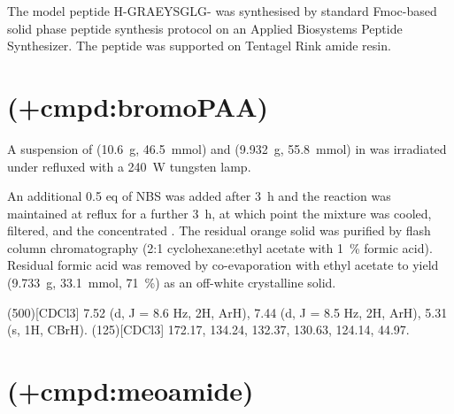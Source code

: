 The model peptide H-GRAEYSGLG-  was synthesised by standard Fmoc-based solid phase peptide synthesis protocol on an Applied Biosystems Peptide Synthesizer. The peptide was supported on Tentagel Rink amide resin.


\section{ (\cmpd+{cmpd:bromoPAA})}

\begin{experimental}[delta=(ppm),pos-number=sub,use-equal]

A suspension of  (\SI{10.6}{\gram}, \SI{46.5}{\milli\mol}) and  (\SI{9.932}{\gram}, \SI{55.8}{\milli\mol}) in  was irradiated under refluxed with a \SI{240}{\watt} tungsten lamp.

An additional 0.5 eq of NBS was added after \SI{3}{\hour} and the reaction was maintained at reflux for a further \SI{3}{\hour}, at which point the mixture was cooled, filtered, and the concentrated \invacuo. The residual orange solid was purified by flash column chromatography (2:1 cyclohexane:ethyl acetate with \SI{1}{\percent} formic acid). Residual formic acid was removed by co-evaporation with ethyl acetate to yield  (\SI{9.733}{\gram}, \SI{33.1}{\milli\mole}, \SI{71}{\percent}) as an off-white crystalline solid.

\NMR(500)[CDCl3] 7.52 (d, J = 8.6 Hz, 2H, ArH), 7.44 (d, J = 8.5 Hz, 2H, ArH), 5.31 (s, 1H, CBrH).
%
(125)[CDCl3] 172.17, 134.24, 132.37, 130.63, 124.14, 44.97.

%
\end{experimental}


\section{ (\cmpd+{cmpd:meoamide})}

